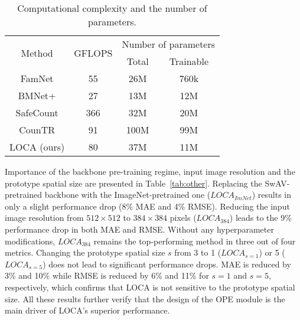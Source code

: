 \documentclass[10pt,twocolumn,letterpaper]{article}
\begin{document}
\begin{table}[htbp]
\centering
\begin{tabular}{c c c c}
 \toprule
 \multirow{2}{*}{Method} & \multirow{2}{*}{GFLOPS} & \multicolumn{2}{c}{Number of parameters} \\
 & & Total & Trainable \\
 \midrule
 FamNet & 55 & 26M & 760k \\
 BMNet+ & 27 & 13M & 12M \\
 SafeCount & 366 & 32M & 20M  \\
 CounTR & 91 & 100M & 99M \\
 LOCA (ours) & 80 & 37M & 11M \\  
 \bottomrule
\end{tabular}
\caption{Computational complexity and the number of parameters.}
\label{tab:params}
\end{table}

Importance of the backbone pre-training regime, input image resolution and the prototype spatial size are presented in Table~\ref{tab:other}.
Replacing the SwAV-pretrained backbone with the ImageNet-pretrained one ($LOCA_{ImNet}$) results in only a slight performance drop (8\% MAE and 4\% RMSE). 
Reducing the input image resolution from $512 \times 512$ to $384 \times 384$ pixels ($LOCA_{384}$) leads to the 9\% performance drop in both MAE and RMSE. 
Without any hyperparameter modifications, $LOCA_{384}$ remains the top-performing method in three out of four metrics.
Changing the prototype spatial size $s$ from 3 to 1 ($LOCA_{s=1}$) or 5 ($LOCA_{s=5}$) does not lead to significant performance drops. 
MAE is reduced by 3\% and 10\% while RMSE is reduced by 6\% and 11\% for $s=1$ and $s=5$, respectively, which confirms that LOCA is not sensitive to the prototype spatial size. 
All these results further verify that the design of the OPE module is the main driver of LOCA's superior performance.
\end{document}
